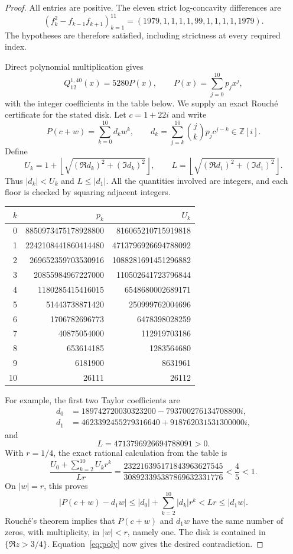 \documentclass[11pt]{article}
\begin{document}
\begin{proof}
All entries are positive. The eleven strict log-concavity differences are
\[
 (f_k^2-f_{k-1}f_{k+1})_{k=1}^{11}
       =(1979,1,1,1,1,99,1,1,1,1,1979).
\]
The hypotheses are therefore satisfied, including strictness at every
required index.

Direct polynomial multiplication gives
\begin{equation}
 Q_{12}^{1,40}(x)=5280P(x),\qquad P(x)=\sum_{j=0}^{10}p_jx^j,
 \label{eq:poly}
\end{equation}
with the integer coefficients in the table below.
We supply an exact Rouch\'e certificate for the stated disk.
Let $c=1+22i$ and write
\[
 P(c+w)=\sum_{k=0}^{10}d_kw^k,\qquad
 d_k=\sum_{j=k}^{10}\binom jk p_jc^{j-k}\in\mathbb Z[i].
\]
Define
\[
 U_k=1+\left\lfloor\sqrt{(\Re d_k)^2+(\Im d_k)^2}\right\rfloor,
 \qquad
 L=\left\lfloor\sqrt{(\Re d_1)^2+(\Im d_1)^2}\right\rfloor.
\]
Thus $|d_k|<U_k$ and $L\leq|d_1|$. All the quantities involved
are integers, and each floor is checked by squaring adjacent integers.

\begin{center}
\begin{tabular}{rrr}
\toprule
$k$ & $p_k$ & $U_k$\\
\midrule
0 & 8850973475178928800 & 816065210715919818\\
1 & 2242108441860414480 & 4713796926694788092\\
2 & 269652359703530916 & 1088281691451296882\\
3 & 20855984967227000 & 110502641723796844\\
4 & 1180285415416015 & 6548680002689171\\
5 & 51443738871420 & 250999762004696\\
6 & 1706782696773 & 6478398028259\\
7 & 40875054000 & 112919703186\\
8 & 653614185 & 1283564680\\
9 & 6181900 & 8631961\\
10 & 26111 & 26112\\
\bottomrule
\end{tabular}
\end{center}
For example, the first two Taylor coefficients are
\begin{align*}
 d_0&=189742720030323200-793700276134708800i,\\
 d_1&=4623392455279316640+918762031531300000i,
\end{align*}
and
\[
 L=4713796926694788091>0.
\]
With $r=1/4$, the exact rational calculation from the table is
\begin{equation}
 \frac{U_0+\sum_{k=2}^{10}U_kr^k}{Lr}
 =\frac{232216395171843963627545}{308923395387869632331776}
 <\frac45<1. \label{eq:certificate}
\end{equation}
On $|w|=r$, this proves
\[
 |P(c+w)-d_1w|
 \leq |d_0|+\sum_{k=2}^{10}|d_k|r^k
 <Lr\leq |d_1w|.
\]
Rouch\'e's theorem implies that $P(c+w)$ and $d_1w$ have the same
number of zeros, with multiplicity, in $|w|<r$, namely one.
The disk is contained in $\{\Re z>3/4\}$.
Equation~\eqref{eq:poly} now gives the desired contradiction.
\end{proof}
\end{document}
